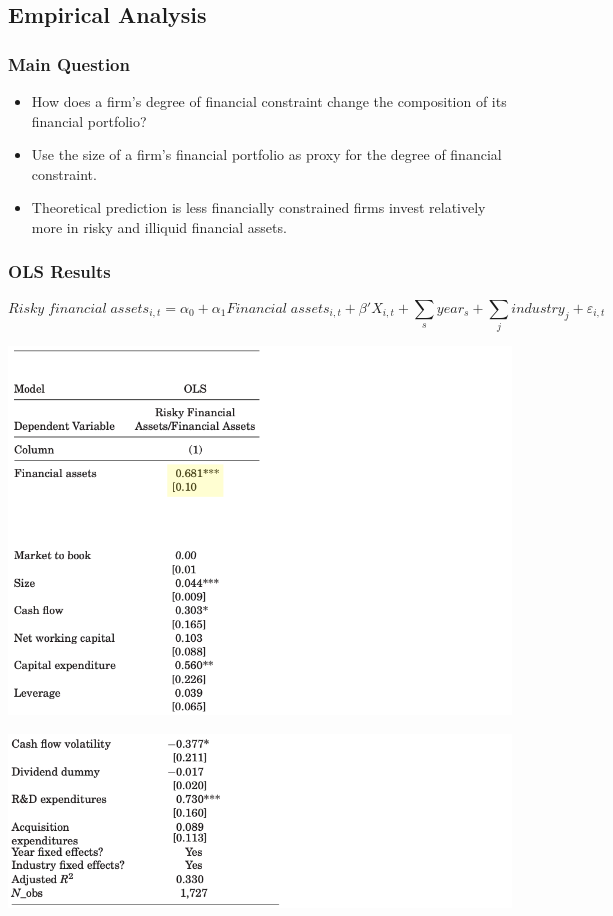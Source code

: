 \documentclass[handout]{beamer}
\begin{document}
\subsection{Empirical Analysis}




\begin{frame}
\frametitle{Main Question}
\begin{itemize}[<+->]
\item How does a firm's degree of financial constraint change the composition of its financial portfolio?
\item Use the size of a firm's financial portfolio as proxy for the degree of financial constraint.
\item Theoretical prediction is less financially constrained firms invest relatively more in risky and illiquid financial assets.
\end{itemize}
\end{frame}


\begin{frame}
\frametitle{OLS Results}

\footnotesize

$$
Risky \; financial \; assets_{i,t} = \alpha_0 + \alpha_1 Financial \; assets_{i,t} + \beta' X_{i,t} + \sum_s year_s + \sum_j industry_j + \varepsilon_{i,t}
$$

\centering
\includegraphics[scale=0.21]{regression_1_ols}

\includegraphics[scale=0.21]{regression_2_ols}

\end{frame}
\end{document}
